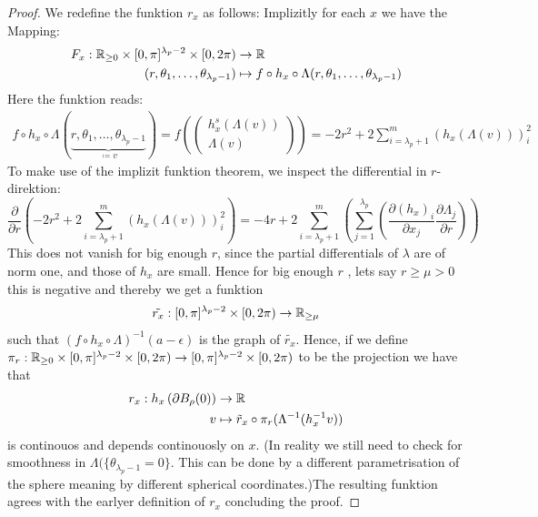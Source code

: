 \begin{proof}
	We redefine the funktion $r_x$ as follows: Implizitly for each $x$ we have the Mapping: 
	\begin{align*}
		F_x:\mathbb{R}_{\geq 0}\times [0,\pi]^{\lambda_{p}-2}\times [0,2\pi) &\to \mathbb{R}\\
		(r,\theta_1,\dots, \theta_{\lambda_p-1})&\mapsto f\circ h_x\circ \Lambda(r,\theta_1,\dots, \theta_{\lambda_p-1})
	\end{align*}
	Here the funktion reads:
	\begin{align*}
		f\circ h_x\circ \Lambda(\underbrace{r,\theta_1,\dots, \theta_{\lambda_p-1}}_{\coloneq v})
		= f(
		\begin{pmatrix}
			h_x^s(\Lambda(v)) \\
			\Lambda (v)
		\end{pmatrix})
		= -2r^2 +2\sum_{i=\lambda_p+1}^{m} \left(h_x(\Lambda(v)) \right)_i^2
	\end{align*} To make use of the implizit funktion theorem, we inspect the differential in $r$-direktion:
	\begin{equation*}
		\frac{\partial}{\partial r}(-2r^2 +2\sum_{i=\lambda_p+1}^{m} \left(h_x(\Lambda(v)) \right)_i^2)=-4r+2\sum_{i=\lambda_p+1}^m\left(\sum_{j=1}^{\lambda_p}\left(
		\frac{\partial (h_x)_i}{\partial x_j}\frac{\partial \Lambda_j}{\partial r}
		\right)\right)
	\end{equation*} This does not vanish for big enough $r$, since the partial differentials of $\lambda$ are of norm one, and those of $h_x$ are small. Hence for big enough $r$ , lets say $r\geq \mu>0$ this is negative and thereby we get a funktion 
	\begin{align*}
		\tilde{r_x}: [0,\pi]^{\lambda_{p}-2}\times [0,2\pi)  \to \mathbb{R}_{\geq \mu}
	\end{align*} such that $(f\circ h_x\circ \Lambda)^{-1}(a-\epsilon) $ is the graph of $\tilde{r_x}$. Hence, if we define $\pi_r: \mathbb{R}_{\geq 0}\times [0,\pi]^{\lambda_{p}-2}\times [0,2\pi) \to [0,\pi]^{\lambda_{p}-2}\times [0,2\pi)$ to be the projection we have that
	\begin{align*}
		r_x: h_x\left(\partial B_{\rho}(0) \right)&\to \mathbb{R}\\
		v&\mapsto \tilde{r}_x\circ \pi_r(\Lambda^{-1}(h_x^{-1} v))
	\end{align*} is continouos and depends continouosly on $x$. (In reality we still need to check for smoothness in $\Lambda(\{\theta_{\lambda_{p}-1}=0\}$. This can be done by a different parametrisation of the sphere meaning by different spherical coordinates.)The resulting funktion agrees with the earlyer definition of $r_x$ concluding the proof. 
\end{proof}




